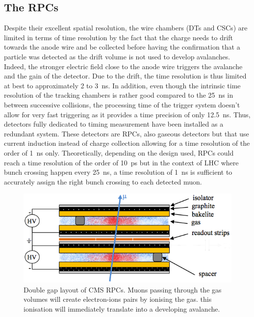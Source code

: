 	\subsection{The \acl{RPC}s}
	\label{chapt3:ssec:RPCs}
	
	Despite their excellent spatial resolution, the wire chambers (DTs and CSCs) are limited in terms of time resolution by the fact that the charge needs to drift towards the anode wire and be collected before having the confirmation that a particle was detected as the drift volume is not used to develop avalanches. Indeed, the stronger electric field close to the anode wire triggers the avalanche and the gain of the detector. Due to the drift, the time resolution is thus limited at best to approximately 2 to \SI{3}{ns}. In addition, even though the intrinsic time resolution of the tracking chambers is rather good compared to the \SI{25}{ns} in between successive collisions, the processing time of the trigger system doesn't allow for very fast triggering as it provides a time precision of only \SI{12.5}{ns}. Thus, detectors fully dedicated to timing measurement have been installed as a redundant system. These detectors are RPCs, also gaseous detectors but that use current induction instead of charge collection allowing for a time resolution of the order of \SI{1}{ns} only. Theoretically, depending on the design used, RPCs could reach a time resolution of the order of \SI{10}{ps} but in the context of LHC where bunch crossing happen every \SI{25}{ns}, a time resolution of \SI{1}{ns} is sufficient to accurately assign the right bunch crossing to each detected muon.
\begingroup\setlength{\intextsep}{5pt}\setlength{\columnsep}{15pt}

	\begin{figure}
		\centering
		\includegraphics[width=\linewidth]{fig/chapt3/RPC_DG_layout.png}
		\caption{\label{fig:RPC-DG-layout} Double gap layout of CMS RPCs. Muons passing through the gas volumes will create electron-ions pairs by ionising the gas. this ionisation will immediately translate into a developing avalanche.}
	\end{figure}
	
